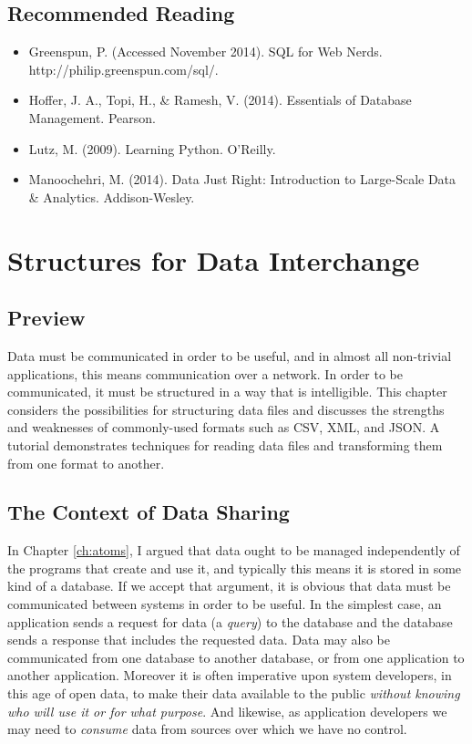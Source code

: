 \documentclass[11pt]{book}
\newcommand{\term}[1]{\emph{#1}} %
\begin{document}
\section*{Recommended Reading}
\begin{itemize}
    \item Greenspun, P.  (Accessed November 2014). SQL for Web Nerds.\\ http://philip.greenspun.com/sql/.
    \item Hoffer, J. A., Topi, H., \& Ramesh, V. (2014). Essentials of Database Management.  Pearson.
    \item Lutz, M. (2009). Learning Python.  O'Reilly.
    \item Manoochehri, M. (2014). Data Just Right: Introduction to Large-Scale Data \& Analytics. Addison-Wesley.
\end{itemize}












\chapter{Structures for Data Interchange}

\section*{Preview}

Data must be communicated in order to be useful, and in almost all non-trivial applications, this means communication over a network.  In order to be communicated, it must be structured in a way that is intelligible.  This chapter considers the possibilities for structuring data files and discusses the strengths and weaknesses of commonly-used formats such as CSV, XML, and JSON.  A tutorial demonstrates techniques for reading data files and transforming them from one format to another.

\section{The Context of Data Sharing}

In Chapter \ref{ch:atoms}, I argued that data ought to be managed independently of the programs that create and use it, and typically this means it is stored in some kind of a database.  If we accept that argument, it is obvious that data must be communicated between systems in order to be useful.  In the simplest case, an application sends a request for data (a \term{query}) to the database and the database sends a response that includes the requested data.  Data may also be communicated from one database to another database, or from one application to another application.  Moreover it is often imperative upon system developers, in this age of open data, to make their data available to the public \emph{without knowing who will use it or for what purpose}.  And likewise, as application developers we may need to \emph{consume} data from sources over which we have no control.
\end{document}
